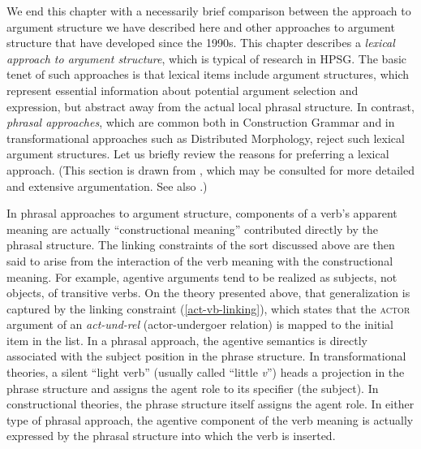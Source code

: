 \documentclass[output=paper
 	        ,biblatex
                ,babelshorthands
                ,newtxmath
                ,draftmode
                ,colorlinks, citecolor=brown
]{langscibook}
\begin{document}
We end this chapter with a necessarily brief comparison between the approach to argument structure we have described here and other approaches to argument structure that have developed since the 1990s.
This chapter describes a \textit{lexical approach to argument structure}, which is typical of research in HPSG.  The basic tenet of such approaches is that lexical items include argument structures, which represent essential information about potential argument selection and expression, but
abstract away from the actual local phrasal structure.  In contrast, \emph{phrasal approaches}, which
are common both in Construction Grammar and in transformational approaches such as Distributed Morphology, reject such lexical argument structures.   Let us briefly review the reasons for preferring a lexical approach. (This section is drawn from \citealt{MWArgSt}, which may be consulted for more detailed and extensive argumentation. See also .) 

In phrasal approaches to argument structure, components of a verb's apparent meaning are actually ``constructional meaning'' contributed directly by the phrasal structure.  The linking constraints of the sort discussed above are then said to arise from the interaction of the verb meaning with the constructional meaning.  For example, agentive arguments tend to be realized as subjects, not objects, of transitive verbs.  On the theory presented above, that generalization is captured by the linking constraint (\ref{act-vb-linking}), which states that the \textsc{actor} argument of an \textit{act-und-rel} (actor-undergoer relation) is mapped to the initial item in the \argst list.  In a phrasal approach, the agentive semantics is directly associated with the subject position in the phrase structure.  In transformational theories, a silent ``light verb'' (usually called ``little \textit{v}'') heads a projection in the phrase structure and assigns the agent role to its specifier (the subject).  In constructional theories, the phrase structure itself assigns the agent role.  In either type of phrasal approach, the agentive component of the verb meaning is actually expressed by the phrasal structure into which the verb is inserted.  
\end{document}
